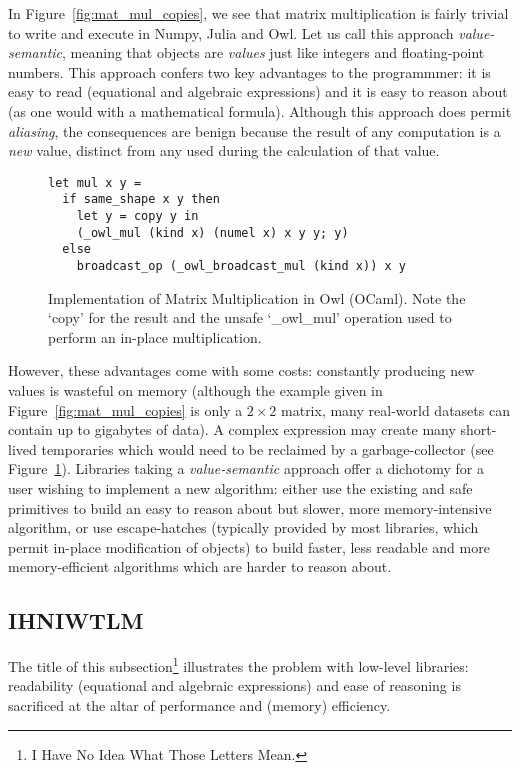 In Figure~\ref{fig:mat_mul_copies}, we see that matrix multiplication is fairly
trivial to write and execute in Numpy, Julia and Owl. Let us call this approach
\emph{value-semantic}, meaning that objects are \emph{values} just like
integers and floating-point numbers. This approach confers two key advantages to the
programmmer: it is easy to read (equational and algebraic expressions) and it
is easy to reason about (as one would with a mathematical formula). Although this
approach does permit \emph{aliasing}, the consequences are benign because the
result of any computation is a \emph{new} value, distinct from any used during
the calculation of that value.

\begin{figure}[tbp]
    \centering
    \begin{verbatim}
let mul x y =
  if same_shape x y then
    let y = copy y in
    (_owl_mul (kind x) (numel x) x y y; y)
  else
    broadcast_op (_owl_broadcast_mul (kind x)) x y
    \end{verbatim}
    \caption{Implementation of Matrix Multiplication in Owl (OCaml).
        Note the `copy' for the result and the unsafe `\_owl\_mul' operation
    used to perform an in-place multiplication.}\label{fig:mat_mul_owl}
\end{figure}

However, these advantages come with some costs: constantly producing new values
is wasteful on memory (although the example given in
Figure~\ref{fig:mat_mul_copies} is only a $2 \times 2$ matrix, many real-world
datasets can contain up to gigabytes of data). A complex expression may create
many short-lived temporaries which would need to be reclaimed by a
garbage-collector (see Figure~\ref{fig:mat_mul_owl}). Libraries taking a
\emph{value-semantic} approach offer a dichotomy for a user wishing to
implement a new algorithm: either use the existing and safe primitives to build
an easy to reason about but slower, more memory-intensive algorithm, or use
escape-hatches (typically provided by most libraries, which permit in-place
modification of objects) to build faster, less readable and more
memory-efficient algorithms which are harder to reason about.

\subsection{IHNIWTLM}

The title of this subsection\footnote{I Have No Idea What Those Letters Mean.}
illustrates the problem with low-level libraries: readability (equational and
algebraic expressions) and ease of reasoning is sacrificed at the altar of
performance and (memory) efficiency.

